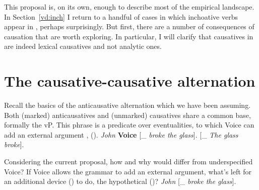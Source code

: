 This proposal is, on its own, enough to describe most of the empirical landscape. In Section~\ref{vd:inch} I return to a handful of cases in which inchoative verbs appear in {\thif}, perhaps surprisingly. But first, there are a number of consequences of causation that are worth exploring. In particular, I will clarify that causatives in {\thif} are indeed lexical causatives and not analytic ones.

		


\section{The causative-causative alternation} \label{vd:caus}
Recall the basics of the anticausative alternation which we have been assuming. Both (marked) anticausatives and (unmarked) causatives share a common base, formally the vP. This phrase is a predicate over eventualities, to which Voice can add an external argument \citep{schaefer08,layering15}, (\nextx).
\pex 
	\a \emph{John} \textbf{Voice} [_{} \emph{broke the glass}].
	\a \textbf{\vz} [_{} \emph{The glass broke}].
\xe

Considering the current proposal, how and why would {\vd} differ from underspecified Voice? If Voice allows the grammar to add an external argument, what's left for an additional device (\vd) to do, the hypothetical (\nextx)?
\ex \emph{John} \textbf{\vd} [_{} \emph{broke the glass}].
\xe

